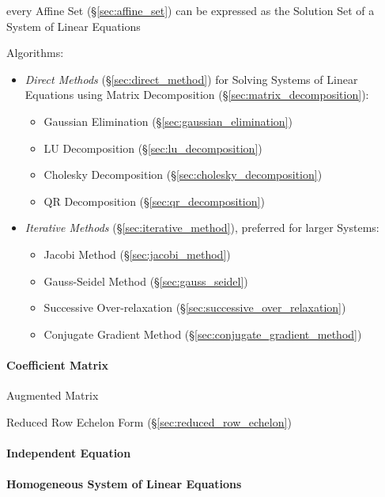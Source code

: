 every Affine Set (\S\ref{sec:affine_set}) can be expressed as the Solution Set
of a System of Linear Equations

Algorithms:
\begin{itemize}
\item \emph{Direct Methods} (\S\ref{sec:direct_method}) for Solving
  Systems of Linear Equations using Matrix Decomposition
  (\S\ref{sec:matrix_decomposition}):
  \begin{itemize}
    \item Gaussian Elimination (\S\ref{sec:gaussian_elimination})
    \item LU Decomposition (\S\ref{sec:lu_decomposition})
    \item Cholesky Decomposition (\S\ref{sec:cholesky_decomposition})
    \item QR Decomposition (\S\ref{sec:qr_decomposition})
  \end{itemize}
\item \emph{Iterative Methods} (\S\ref{sec:iterative_method}), preferred
  for larger Systems:
  \begin{itemize}
    \item Jacobi Method (\S\ref{sec:jacobi_method})
    \item Gauss-Seidel Method (\S\ref{sec:gauss_seidel})
    \item Successive Over-relaxation
      (\S\ref{sec:successive_over_relaxation})
    \item Conjugate Gradient Method
      (\S\ref{sec:conjugate_gradient_method})
  \end{itemize}
\end{itemize}



\paragraph{Coefficient Matrix}\label{sec:coefficient_matrix}\hfill

Augmented Matrix

Reduced Row Echelon Form (\S\ref{sec:reduced_row_echelon})



\paragraph{Independent Equation}\label{sec:independent_equation}\hfill

\paragraph{Homogeneous System of Linear Equations}\hfill
\label{sec:homogeneous_linear_equation_system}

